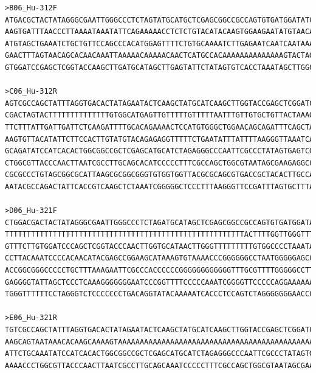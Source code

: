 \begin{verbatim}
>B06_Hu-312F
ATGACGCTACTATAGGGCGAATTGGGCCCTCTAGTATGCATGCTCGAGCGGCCGCCAGTGTGATGGATATCTGCAGAATTCGCCCTTGGCTCAACCTCAAGCAGTAATAAACACAAGCAA
AAGTGATTTAACCCTTAAAATAAATATTCAGAAAAACCTCTCTGTACATACAAGTGGAAGAATATGTAACACTTTCACGCAAAAAAATAATTATAATAATAATAAAGGATTTGTTCATAT
ATGTAGCTGAAATCTGCTGTTCCAGCCCACATGGAGTTTTCTGTGCAAAATCTTGAGAATCAATCAATAAAGAAAGATGGAAGGAAGGGAGAAATTGGAATGTTTTAACTGCAGCCCTCA
GAACTTTAGTAACAGCACAACAAATTAAAAACAAAAACAACTCATGCCACAAAAAAAAAAAAAAGTACTAGTCGACCGCGTGGCCAAGGGCGAATTCCAGCACACTGGCGGCCGTTACTA
GTGGATCCGAGCTCGGTACCAAGCTTGATGCATAGCTTGAGTATTCTATAGTGTCACCTAAATAGCTTGGCGTAATCAT

>C06_Hu-312R
AGTCGCCAGCTATTTAGGTGACACTATAGAATACTCAAGCTATGCATCAAGCTTGGTACCGAGCTCGGATCCACTAGTAACGGCCGCCAGTGTGCTGGAATTCGCCCTTGGCCACGCGGT
CGACTAGTACTTTTTTTTTTTTTTGTGGCATGAGTTGTTTTTGTTTTTAATTTGTTGTGCTGTTACTAAAGTTCTGAGGGCTGCAGTTAAAACATTCCAATTTCTCCCTTCCTTCCATCT
TTCTTTATTGATTGATTCTCAAGATTTTGCACAGAAAACTCCATGTGGGCTGGAACAGCAGATTTCAGCTACATATATGAACAAATCCTTTATTATTATTATAATTATTTTTTTGCGTGA
AAGTGTTACATATTCTTCCACTTGTATGTACAGAGAGGTTTTTCTGAATATTTATTTTAAGGGTTAAATCACTTTTGCTTGTGTTTATTACTGCTTGAGGTTGAGCCAAGGGCGAATTCT
GCAGATATCCATCACACTGGCGGCCGCTCGAGCATGCATCTAGAGGGCCCAATTCGCCCTATAGTGAGTCGTATTACAATTCACTGGCCGTCGTTTTACAACGTCGTGACTGGGAAAACC
CTGGCGTTACCCAACTTAATCGCCTTGCAGCACATCCCCCTTTCGCCAGCTGGCGTAATAGCGAAGAGGCCCGCACCGATCGCCCTTCCCAACAGTTGCGCAGCCTGAATGGCGAATGGA
CGCGCCCTGTAGCGGCGCATTAAGCGCGGCGGGTGTGGTGGTTACGCGCAGCGTGACCGCTACACTTGCCAGCGCCCTAGCGCCCGCTCCTTTCGCTTTCTTCCCTTCCTTTCTCGCCAC
AATACGCCAGACTATTCACCGTCAAGCTCTAAATCGGGGGCTCCCTTTAAGGGTTCCGATTTAGTGCTTTACCGGCACCTCGACCCCAAAAAAACTTTGATTAAGGGTGATGGTTC

>D06_Hu-321F
CTGGACGACTACTATAGGGCGAATTGGGCCCTCTAGATGCATAGCTCGAGCGGCCGCCAGTGTGATGGATATCTGCAGAATTCGCCCTTGGCCACGCGTCGACTAGTACTTTTTTTTTTT
TTTTTTTTTTTTTTTTTTTTTTTTTTTTTTTTTTTTTTTTTTTTTTTTTTTTTTTACTTTTGGTTGGGTTTATTACTGGTTGGGGGTGAGCCAAGGGGGAATTCCCCCCCACTGGGGGCC
GTTTCTTGTGGATCCCAGCTCGGTACCCAACTTGGTGCATAACTTGGGTTTTTTTTTGTGGCCCCTAAATAGCTTGGGGTAATCCTGGGCATAGCTTTTTCCCGGGGGAAAATTTTATCC
CCTTACAAATCCCCACAACATACGAGCCGGAAGCATAAAGTGTAAAACCCGGGGGGCCTAATGGGGGAGCCAACTCCCATTTATTGGGTTGGGCCTACCGGCCCCTTTTCCAGCGGGAAA
ACCGGCGGGCCCCCTGCTTTAAAGAATTCGCCCACCCCCCGGGGGGGGGGGGTTTGCGTTTTGGGGGCCTTTCCCCTTTCCCCGTTATGGACCCCTTGCGCCTGGTCGTTCGGGTGGGGG
GAGGGGTATTAGCTCCCTCAAAGGGGGGGAATCCCGGTTTTCCCCCAAATCGGGGTTCCCCCAGGAAAAAAATTTGACCAAAGGCCCCCAAAAGGCCCGGACCCTAAAAGGGCCCCTTCT
TGGGTTTTTTCCTAGGGTCTCCCCCCCTGACAGGTATACAAAAATCACCCTCCAGTCTAGGGGGGGAACCCCGCAGGGCTATATAGATCCCACGGGTTTTCCCCTGGAAATCCCCTTGCG

>E06_Hu-321R
TGTCGCCAGCTATTTAGGTGACACTATAGAATACTCAAGCTATGCATCAAGCTTGGTACCGAGCTCGGATCCACTAGTAACGGCCGCCAGTGTGCTGGAATTCGCCCTTGGCTCAACCTC
AAGCAGTAATAAACACAAGCAAAAGTAAAAAAAAAAAAAAAAAAAAAAAAAAAAAAAAAAAAAAAAAAAAAAAAAAAAAAAAAAAAAAAAAAGTACTAGTCGACGCGTGGCCAAGGGCGA
ATTCTGCAAATATCCATCACACTGGCGGCCGCTCGAGCATGCATCTAGAGGGCCCAATTCGCCCTATAGTGAGTCGTATTACAATTCACTGGCCGTCGTTTTACAACGTCGTGACTGGGA
AAAACCCTGGCGTTACCCAACTTAATCGCCTTGCAGCAAATCCCCCTTTCGCCAGCTGGCGTAATAGCGAAAAGGCCCGCACCGATCGCCCTTCCCAACAGTTGCGCACCCTGAA


\end{verbatim}
